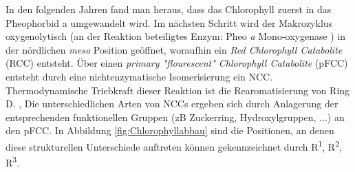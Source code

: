 \pagebreak
In den folgenden Jahren fand man heraus, dass das Chlorophyll zuerst in das Pheophorbid a umgewandelt wird. Im nächsten Schritt wird der Makrozyklus oxygenolytisch (an der Reaktion beteiligtes Enzym: Pheo \textit{a} Mono-oxygenase \cite{ChlorophyllCatabolitesEnzyme}) in der nördlichen \textit{meso} Position geöffnet, woraufhin ein \textit{Red Chlorophyll Catabolite} (RCC) entsteht. 
Über einen \textit{primary "flourescent" Chlorophyll Catabolite} (pFCC) entsteht durch eine nichtenzymatische Isomerisierung ein \gls{NCC}. Thermodynamische Triebkraft dieser Reaktion ist die Rearomatisierung von Ring D. \cite{FCCKatabolit}, \cite{ChlorophyllCatabolites} Die unterschiedlichen Arten von \gls{NCC}s ergeben sich durch Anlagerung der entsprechenden funktionellen Gruppen (\gls{zB} Zuckerring, Hydroxylgruppen, ...) an den pFCC. \cite{ChlorophyllCatabolites} In Abbildung \ref{fig:Chlorophyllabbau} sind die Positionen, an denen diese strukturellen Unterschiede auftreten können gekennzeichnet durch R\textsuperscript{1}, R\textsuperscript{2}, R\textsuperscript{3}.





